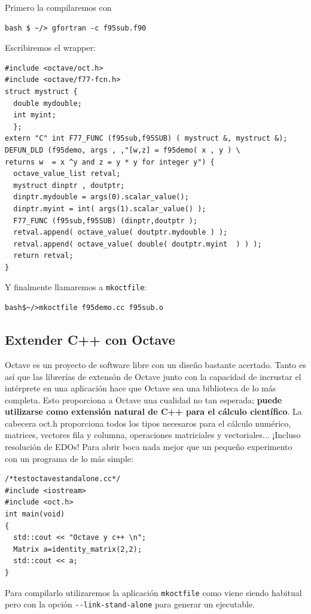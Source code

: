 Primero la compilaremos con

\begin{verbatim}
bash $ ~/> gfortran -c f95sub.f90
\end{verbatim}

Escribiremos el wrapper:
\begin{verbatim}
#include <octave/oct.h>
#include <octave/f77-fcn.h>
struct mystruct {
  double mydouble;
  int myint;
  };
extern "C" int F77_FUNC (f95sub,f95SUB) ( mystruct &, mystruct &); 
DEFUN_DLD (f95demo, args , ,"[w,z] = f95demo( x , y ) \
returns w  = x ^y and z = y * y for integer y") {
  octave_value_list retval;
  mystruct dinptr , doutptr;
  dinptr.mydouble = args(0).scalar_value();
  dinptr.myint = int( args(1).scalar_value() );
  F77_FUNC (f95sub,f95SUB) (dinptr,doutptr );
  retval.append( octave_value( doutptr.mydouble ) );
  retval.append( octave_value( double( doutptr.myint  ) ) );
  return retval;
}
\end{verbatim}
Y finalmente llamaremos a \texttt{mkoctfile}:
\begin{verbatim}
bash$~/>mkoctfile f95demo.cc f95sub.o
\end{verbatim}

\subsection{Extender C++ con Octave}

Octave es un proyecto de software libre con un diseño bastante
acertado.  Tanto es así que las librerías de extensón de Octave junto
con la capacidad de incrustar el intérprete en una aplicación hace que
Octave sea una biblioteca de lo más completa. Esto proporciona a
Octave una cualidad no tan esperada; \textbf{puede utilizarse como
  extensión natural de C++ para el cálculo científico}. La cabecera
oct.h proporciona todos los tipos necesaros para el cálculo numérico,
matrices, vectores fila y columna, operaciones matriciales y
vectoriales... ¡Incluso resolución de EDOs! Para abrir boca nada mejor
que un pequeño experimento con un programa de lo más simple:

\begin{verbatim}
/*testoctavestandalone.cc*/
#include <iostream>
#include <oct.h>
int main(void)
{
  std::cout << "Octave y c++ \n";
  Matrix a=identity_matrix(2,2);
  std::cout << a;
}
\end{verbatim}

Para compilarlo utilizaremos la aplicación \texttt{mkoctfile} como
viene siendo habitual pero con la opción \texttt{-{}-link-stand-alone}
para generar un ejecutable.

